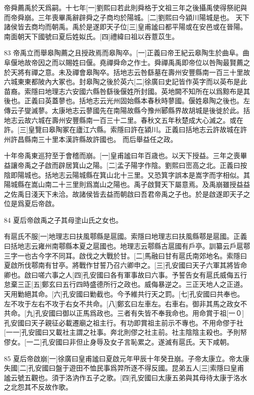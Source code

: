 帝舜薦禹於天爲嗣。十七年[一]劉熙曰若此則舜格于文祖三年之後攝禹使得祭祀與而帝舜崩。三年喪畢禹辭辟舜之子商均於陽城。[二]劉熙曰今潁川陽城是也。 天下諸侯皆去商均而朝禹。禹於是遂即天子位[三]皇甫謐曰都平陽或在安邑或在晉陽。南面朝天下國號曰夏后姓姒氏。[四]禮緯曰祖以吞薏苡生。

83
帝禹立而舉皋陶薦之且授政焉而皋陶卒。[一]正義曰帝王紀云皋陶生於曲阜。曲阜偃地故帝因之而以賜姓曰偃。堯禪舜命之作士。舜禪禹禹即帝位以咎陶最賢薦之於天將有禪之意。未及禪會皋陶卒。括地志云咎繇墓在壽州安豐縣南一百三十里故六城東東都陂內大冢也。封皋陶之後於英六[二]徐廣曰史記皆作英字而以英布是此苗裔。索隱曰地理志六安國六縣咎繇後偃姓所封國。英地闕不知所在以爲黥布是其後也。正義曰英蓋蓼也。括地志云光州固始縣本春秋時蓼國。偃姓皋陶之後也。左傳云子燮滅蓼。太康地志云蓼國先在南陽故縣今豫州郾縣界故胡城是後徙於此。括地志云故六城在壽州安豐縣南一百三十二里。春秋文五年秋楚成大心滅之。或在許。[三]皇覽曰皋陶冢在廬江六縣。索隱曰許在潁川。正義曰括地志云許故城在許州許昌縣南三十里本漢許縣故許國也。 而后舉益任之政。

十年帝禹東巡狩至于會稽而崩。[一]皇甫謐曰年百歳也。以天下授益。三年之喪畢益讓帝禹之子啟而辟居箕山之陽。[二]孟子陽字作陰。劉熙曰崈高之北。正義曰按陰即陽城也。括地志云陽城縣在箕山北十三里。又恐箕字誤本是嵩字而字相似。其陽城縣在嵩山南二十三里則爲嵩山之陽也。禹子啟賢天下屬意焉。及禹崩雖授益益之佐禹日淺天下未洽。故諸侯皆去益而朝啟曰吾君帝禹之子也。於是啟遂即天子之位是爲夏后帝啟。

84
夏后帝啟禹之子其母塗山氏之女也。

有扈氏不服[一]地理志曰扶風鄠縣是扈國。索隱曰地理志曰扶風縣鄠是扈國。正義曰括地志云雍州南鄠縣本夏之扈國也。地理志云鄠縣古扈國有戶亭。訓纂云戶扈鄠三字一也古今字不同耳。啟伐之大戰於甘。[二]馬融曰甘有扈氏南郊地名。索隱曰夏啟所伐鄠南有甘亭。將戰作甘誓乃召六卿申之。[三]孔安國曰天子六軍其將皆命卿也。啟曰嗟六事之人[四]孔安國曰各有軍事故曰六事。予誓告女有扈氏威侮五行怠棄三正[五]鄭玄曰五行四時盛德所行之政也。威侮暴逆之。三正天地人之正道。天用勦絕其命。[六]孔安國曰勦截也。今予維共行天之罰。[七]孔安國曰共奉也。左不攻于左右不攻于右女不共命。[八]鄭玄曰左車左。右車右。御非其馬之政女不共命。[九]孔安國曰御以正馬爲政也。三者有失皆不奉我命也。用命賞于祖[一０]孔安國曰天子親征必載遷廟之祖主行。有功即賞祖主前示不專也。不用命僇于社[一一]孔安國曰又載社主謂之社事。奔北則僇之社主前。社主陰陰主殺也。予則帑僇女。[一二]孔安國曰非但止身辱及女子言恥累之。遂滅有扈氏。天下咸朝。

85
夏后帝啟崩[一]徐廣曰皇甫謐曰夏啟元年甲辰十年癸丑崩。子帝太康立。帝太康失國[二]孔安國曰盤于遊田不恤民事爲羿所逐不得反國。昆弟五人[三]索隱曰皇甫謐云號五觀也。須于洛汭作五子之歌。[四]孔安國曰太康五弟與其母待太康于洛水之北怨其不反故作歌。

